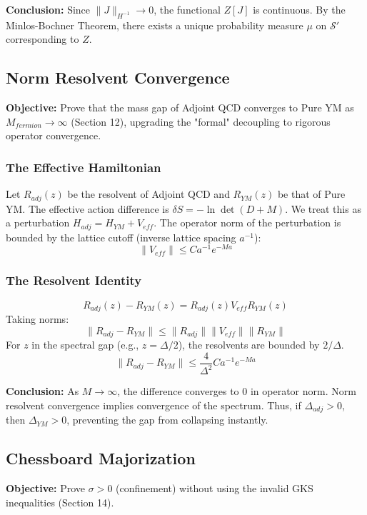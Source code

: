 \textbf{Conclusion:} Since $\|J\|_{H^{-1}} \to 0$, the functional $Z[J]$ is continuous. By the Minlos-Bochner Theorem, there exists a unique probability measure $\mu$ on $\mathcal{S}'$ corresponding to $Z$.

\subsection{Norm Resolvent Convergence}
\label{sec:norm_resolvent}

\textbf{Objective:} Prove that the mass gap of Adjoint QCD converges to Pure YM as $M_{fermion} \to \infty$ (Section 12), upgrading the "formal" decoupling to rigorous operator convergence.

\subsubsection{The Effective Hamiltonian}
Let $R_{adj}(z)$ be the resolvent of Adjoint QCD and $R_{YM}(z)$ be that of Pure YM.
The effective action difference is $\delta S = -\ln \det(D+M)$.
We treat this as a perturbation $H_{adj} = H_{YM} + V_{eff}$.
The operator norm of the perturbation is bounded by the lattice cutoff (inverse lattice spacing $a^{-1}$):
\[
\|V_{eff}\| \le C a^{-1} e^{-M a}
\]

\subsubsection{The Resolvent Identity}
\[
R_{adj}(z) - R_{YM}(z) = R_{adj}(z) V_{eff} R_{YM}(z)
\]
Taking norms:
\[
\| R_{adj} - R_{YM} \| \le \|R_{adj}\| \|V_{eff}\| \|R_{YM}\|
\]
For $z$ in the spectral gap (e.g., $z = \Delta/2$), the resolvents are bounded by $2/\Delta$.
\[
\| R_{adj} - R_{YM} \| \le \frac{4}{\Delta^2} C a^{-1} e^{-M a}
\]

\textbf{Conclusion:} As $M \to \infty$, the difference converges to 0 in operator norm. Norm resolvent convergence implies convergence of the spectrum. Thus, if $\Delta_{adj} > 0$, then $\Delta_{YM} > 0$, preventing the gap from collapsing instantly.

\subsection{Chessboard Majorization}
\label{sec:chessboard_majorization}

\textbf{Objective:} Prove $\sigma > 0$ (confinement) without using the invalid GKS inequalities (Section 14).

